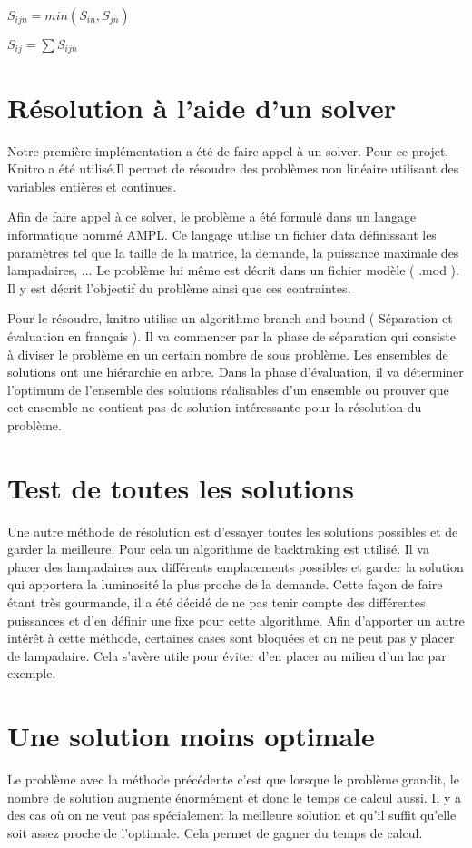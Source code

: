 $
S_{ijn}=min(S_{in},S_{jn})
$

$
S_{ij}=\sum{S_{ijn}}
$

\section{Résolution à l'aide d'un solver}
Notre première implémentation a été de faire appel à un solver. Pour ce projet, Knitro a été utilisé.Il permet de résoudre des problèmes non linéaire utilisant des variables entières et continues.

Afin de faire appel à ce solver, le problème a été formulé dans un langage informatique nommé AMPL. Ce langage utilise un fichier data définissant les paramètres tel que la taille de la matrice, la demande, la puissance maximale des lampadaires, ... 
Le problème lui même est décrit dans un fichier modèle ( .mod ). Il y est décrit l'objectif du problème ainsi que ces contraintes.

Pour le résoudre, knitro utilise un algorithme branch and bound ( Séparation et évaluation en français ).
Il va commencer par la phase de séparation qui consiste à diviser le problème en un certain nombre de sous problème. Les ensembles de solutions ont une hiérarchie en arbre. Dans la phase d'évaluation, il va déterminer l'optimum de l'ensemble des solutions réalisables d'un ensemble ou prouver que cet ensemble ne contient pas de solution intéressante pour la résolution du problème.


\section{Test de toutes les solutions}
Une autre méthode de résolution est d'essayer toutes les solutions possibles et de garder la meilleure. Pour cela un algorithme de backtraking est utilisé. Il va placer des lampadaires aux différents emplacements possibles et garder la solution qui apportera la luminosité la plus proche de la demande.
Cette façon de faire étant très gourmande, il a été décidé de ne pas tenir compte des différentes puissances et d'en définir une fixe pour cette algorithme. Afin d'apporter un autre intérêt à cette méthode,  certaines cases sont bloquées et on ne peut pas y placer de lampadaire. Cela s'avère utile pour éviter d'en placer au milieu d'un lac par exemple.

\section{Une solution moins optimale}
Le problème avec la méthode précédente c'est que lorsque le problème grandit, le nombre de solution augmente énormément et donc le temps de calcul aussi. Il y a des cas où on ne veut pas spécialement la meilleure solution et qu'il suffit qu'elle soit assez proche de l'optimale. Cela permet de gagner du temps de calcul. 

